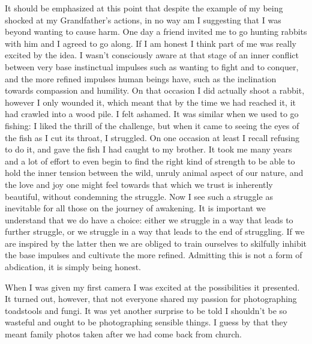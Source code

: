 It should be emphasized at this point that despite the example of my
being shocked at my Grandfather's actions, in no way am I suggesting
that I was beyond wanting to cause harm. One day a friend invited me to
go hunting rabbits with him and I agreed to go along. If I am honest I
think part of me was really excited by the idea. I wasn't consciously
aware at that stage of an inner conflict between very base instinctual
impulses such as wanting to fight and to conquer, and the more refined
impulses human beings have, such as the inclination towards compassion
and humility. On that occasion I did actually shoot a rabbit, however I
only wounded it, which meant that by the time we had reached it, it had
crawled into a wood pile. I felt ashamed.
It was similar when we used to go fishing: I liked the
thrill of the challenge, but when it came to seeing the eyes of the fish
as I cut its throat, I struggled. On one occasion at least I recall
refusing to do it, and gave the fish I had caught to my brother. It took
me many years and a lot of effort to even begin to find the right kind
of strength to be able to hold the inner tension between the wild,
unruly animal aspect of our nature, and the love and joy one might feel
towards that which we trust is inherently beautiful, without condemning
the struggle. Now I see such a struggle as inevitable for all those on
the journey of awakening. It is important we understand that we do have
a choice: either we struggle in a way that leads to further struggle, or
we struggle in a way that leads to the end of struggling. If we are
inspired by the latter then we are obliged to train ourselves to
skilfully inhibit the base impulses and cultivate the more refined.
Admitting this is not a form of abdication, it is simply being honest.

When I was given my first camera I was excited at the possibilities it
presented. It turned out, however, that not everyone shared my passion
for photographing toadstools and fungi. It was yet another surprise to
be told I shouldn't be so wasteful and ought to be photographing
sensible things. I guess by that they meant family photos taken after we
had come back from church.

